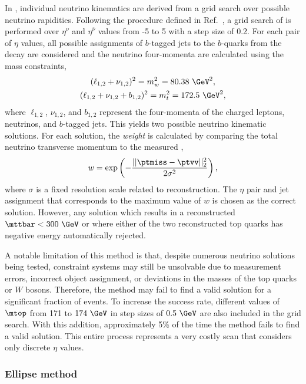 In \vweight, individual neutrino kinematics are derived from a grid search over possible neutrino rapidities.
Following the procedure defined in Ref.~\cite{ATLAS:2019zrq}, a grid search of is performed over $\eta^\nu$ and $\eta^{\bar\nu}$ values from -5 to 5 with a step size of 0.2.
For each pair of $\eta$ values, all possible assignments of $b$-tagged jets to the $b$-quarks from the \ttbar decay are considered and the neutrino four-momenta are calculated using the mass constraints,
\begin{gather}
    \label{eq:mass_constraints}
    (\ell_{1, 2} + \nu_{1, 2})^2 = m_w^2 = 80.38~\GeV^2, \\
    (\ell_{1, 2} + \nu_{1, 2} + b_{1, 2})^2 = m_t^2 = 172.5~\GeV^2,
\end{gather}
where $\ell_{1, 2}$, $\nu_{1, 2}$, and $b_{1, 2}$ represent the four-momenta of the charged leptons, neutrinos, and $b$-tagged jets.
This yields two possible neutrino kinematic solutions.
For each solution, the \textit{weight} is calculated by comparing the total neutrino transverse momentum \ptvv to the measured \ptmiss,
\begin{equation}
    \label{eq:neutrino_weight}
    w = \exp \left( - \frac{||\ptmiss - \ptvv||_2^2}{2 \sigma^2} \right),
\end{equation}
where $\sigma$ is a fixed resolution scale related to \ptmiss reconstruction.
The $\eta$ pair and jet assignment that corresponds to the maximum value of $w$ is chosen as the correct solution.
However, any solution which results in a reconstructed $\mttbar < 300~\GeV$ or where either of the two reconstructed top quarks has negative energy automatically rejected.

A notable limitation of this method is that, despite numerous neutrino solutions being tested, constraint systems may still be unsolvable due to measurement errors, incorrect object assignment, or deviations in the masses of the top quarks or
$W$ bosons.
Therefore, the method may fail to find a valid solution for a significant fraction of events.
To increase the success rate, different values of $\mtop$ from 171 to $174~\GeV$ in step sizes of $0.5~\GeV$ are also included in the grid search.
With this addition, approximately 5\% of the time the \vweight method fails to find a valid solution.
This entire process represents a very costly scan that considers only discrete $\eta$ values.

\subsubsection{Ellipse method}

